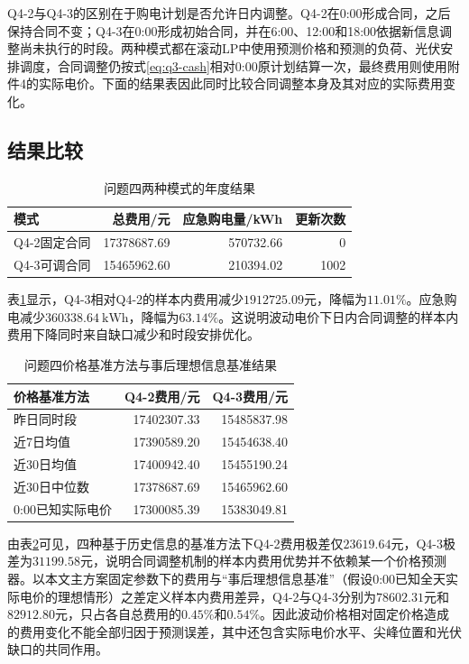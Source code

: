 \documentclass[UTF8,12pt,a4paper]{ctexart}
\theoremstyle{remark}
\begin{document}
Q4-2与Q4-3的区别在于购电计划是否允许日内调整。Q4-2在0:00形成合同，之后保持合同不变；Q4-3在0:00形成初始合同，并在6:00、12:00和18:00依据新信息调整尚未执行的时段。两种模式都在滚动LP中使用预测价格和预测的负荷、光伏安排调度，合同调整仍按式\eqref{eq:q3-cash}相对0:00原计划结算一次，最终费用则使用附件4的实际电价。下面的结果表因此同时比较合同调整本身及其对应的实际费用变化。

\subsection{结果比较}
\begin{table}[htbp]\centering\caption{问题四两种模式的年度结果}\label{tab:q4-result}
\begin{tabular}{lrrr}\toprule 模式&总费用/元&应急购电量/kWh&更新次数\\\midrule
Q4-2固定合同&17378687.69&570732.66&0\\Q4-3可调合同&15465962.60&210394.02&1002\\\bottomrule\end{tabular}\end{table}
表\ref{tab:q4-result}显示，Q4-3相对Q4-2的样本内费用减少$1912725.09$元，降幅为$11.01\%$。应急购电减少$360338.64\ \mathrm{kWh}$，降幅为$63.14\%$。这说明波动电价下日内合同调整的样本内费用下降同时来自缺口减少和时段安排优化。

\begin{table}[htbp]\centering\small
\caption{问题四价格基准方法与事后理想信息基准结果}\label{tab:q4-baselines}
\begin{tabular}{lrr}\toprule
价格基准方法&Q4-2费用/元&Q4-3费用/元\\\midrule
昨日同时段&17402307.33&15485837.98\\
近7日均值&17390589.20&15454638.40\\
近30日均值&17400942.40&15455190.24\\
近30日中位数&17378687.69&15465962.60\\
0:00已知实际电价&17300085.39&15383049.81\\\bottomrule
\end{tabular}\end{table}

由表\ref{tab:q4-baselines}可见，四种基于历史信息的基准方法下Q4-2费用极差仅$23619.64$元，Q4-3极差为$31199.58$元，说明合同调整机制的样本内费用优势并不依赖某一个价格预测器。以本文主方案固定参数下的费用与“事后理想信息基准”（假设0:00已知全天实际电价的理想情形）之差定义样本内费用差异，Q4-2与Q4-3分别为$78602.31$元和$82912.80$元，只占各自总费用的$0.45\%$和$0.54\%$。因此波动价格相对固定价格造成的费用变化不能全部归因于预测误差，其中还包含实际电价水平、尖峰位置和光伏缺口的共同作用。
\end{document}
